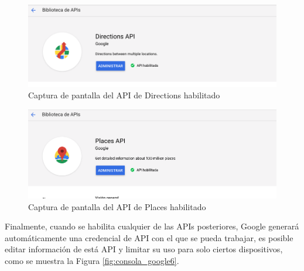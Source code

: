 \begin{figure}[H]
	\centering
	\includegraphics[scale=.3]{Capitulo5/software/submodulos/aplicacion/images/4}
	\caption{Captura de pantalla del API de Directions habilitado}
	\label{fig:consola_google4}
\end{figure}

\begin{figure}[H]
	\centering
	\includegraphics[scale=.3]{Capitulo5/software/submodulos/aplicacion/images/5}
	\caption{Captura de pantalla del API de Places habilitado}
	\label{fig:consola_google5}
\end{figure}

Finalmente, cuando se habilita cualquier de las APIs posteriores, Google generará automáticamente una credencial de API con el que se pueda trabajar, es posible editar información de está API y limitar su uso para solo ciertos dispositivos, como se muestra la Figura \ref{fig:consola_google6}.

